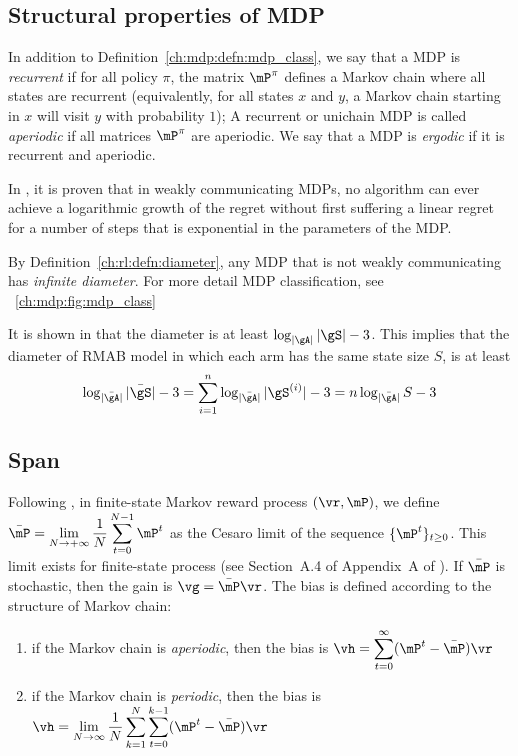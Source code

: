 
\subsection{Structural properties of MDP}
\label{ssec:mdp_params}

In addition to Definition~\ref{ch:mdp:defn:mdp_class}, we say that a MDP is \emph{recurrent} if for all policy $\pi$, the matrix $\mP^\pi$ defines a Markov chain where all states are recurrent (equivalently, for all states $x$ and $y$, a Markov chain starting in $x$ will visit $y$ with probability $1$);
A recurrent or unichain MDP is called \emph{aperiodic} if all matrices $\mP^\pi$ are aperiodic.  We say that a MDP is \emph{ergodic} if it is recurrent and aperiodic. 

In \cite{fruit2018near}, it is proven that in weakly communicating MDPs, no algorithm can ever achieve a logarithmic growth of the regret without first suffering a linear regret for a number of steps that is exponential in the parameters of the MDP.

By Definition~\ref{ch:rl:defn:diameter}, any MDP that is not weakly communicating has \emph{infinite diameter}.
For more detail MDP classification, see \figurename~\ref{ch:mdp:fig:mdp_class}

It is shown in \cite[Appendix A]{jaksch2010near} that the diameter is at least $\log_{|\gA|}|\gS|-3$.
This implies that the diameter of RMAB model in which each arm has the same state size $S$, is at least
\begin{equation*}
    \log_{|\bar{\gA}|}|\bar{\gS}| -3 = \sum_{i=1}^{n}\log_{|\bar{\gA}|}|\gS^{(i)}| -3 =n\log_{|\bar{\gA}|}S -3
\end{equation*}

\subsection{Span}


Following \cite[Chapter~8]{puterman2014markov}, in finite-state Markov reward process $(\vr, \mP)$, we define $\bar{\mP}=\displaystyle\lim_{N\to+\infty}\frac1N\sum_{t=0}^{N-1}\mP^{t}$ as the Cesaro limit of the sequence $\{\mP^t\}_{t\ge0}$.
This limit exists for finite-state process (see Section~A.4 of Appendix~A of \cite{puterman2014markov}).
If $\bar{\mP}$ is stochastic, then the gain is $\vg=\bar{\mP}\vr$.
The bias is defined according to the structure of Markov chain:
\begin{enumerate}
    \item if the Markov chain is \emph{aperiodic}, then the bias is $\vh=\displaystyle\sum_{t=0}^\infty(\mP^t-\bar{\mP})\vr$
    \item if the Markov chain is \emph{periodic}, then the bias is $\vh=\displaystyle\lim_{N\to\infty}\frac1N\sum_{k=1}^N\sum_{t=0}^{k-1}(\mP^t-\bar{\mP})\vr$
\end{enumerate}

